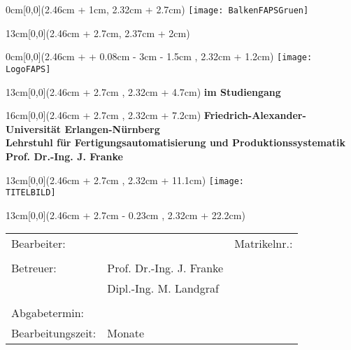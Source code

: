 
\fancyhead{} 
\renewcommand{\headrulewidth}{0pt}
\renewcommand{\footrulewidth}{0pt}
\setlength{\arrayrulewidth}{0.5pt}
\renewcommand{\baselinestretch}{1.5}\normalsize

\begin{textblock*}{0cm}[0,0](2.46cm + 1cm, 2.32cm + 2.7cm)
	\texttt{[image: BalkenFAPSGruen]}
\end{textblock*}

\begin{textblock*}{13cm}[0,0](2.46cm + 2.7cm, 2.37cm + 2cm)
	\singlespacing
	\Large \bfseries \TITEL
\end{textblock*}

\begin{textblock*}{0cm}[0,0](2.46cm + \paperwidth + 0.08cm - 3cm - 1.5cm , 2.32cm + 1.2cm)
	\texttt{[image: LogoFAPS]}
\end{textblock*}

\begin{textblock*}{13cm}[0,0](2.46cm + 2.7cm , 2.32cm + 4.7cm)
	\singlespacing
	\bfseries \ARBEIT\; im Studiengang \STUDIENGANG
\end{textblock*}

\begin{textblock*}{16cm}[0,0](2.46cm + 2.7cm , 2.32cm + 7.2cm)
	\singlespacing
	\bfseries
	Friedrich-Alexander-Universität Erlangen-Nürnberg\\
	Lehrstuhl für Fertigungsautomatisierung und Produktionssystematik\\
	Prof. Dr.-Ing. J. Franke
\end{textblock*}

\begin{textblock*}{13cm}[0,0](2.46cm + 2.7cm , 2.32cm + 11.1cm)
	\texttt{[image: \\TITELBILD]}
\end{textblock*}

\begin{textblock*}{13cm}[0,0](2.46cm + 2.7cm - 0.23cm , 2.32cm + 22.2cm)
\singlespacing
\begin{table}[h!]
	\begin{tabular}{p{3.5cm}p{7cm}R{4.2cm}}
		Bearbeiter: 	&	\NAME 				& Matrikelnr.: \MATRNR\\
		& & \\
		Betreuer:		&	Prof. Dr.-Ing. J. Franke	& \\ 
					&	Dipl.-Ing. M. Landgraf	& \\
		& & \\
		Abgabetermin: 	&	\ENDE 				& \\
		Bearbeitungszeit:	&	\BEARBEITUNGSZEIT\; Monate &
	\end{tabular}
\end{table}
\end{textblock*}

\thispagestyle{empty}
\renewcommand{\baselinestretch}{1.25}\normalsize
\mbox{ }

\newpage



